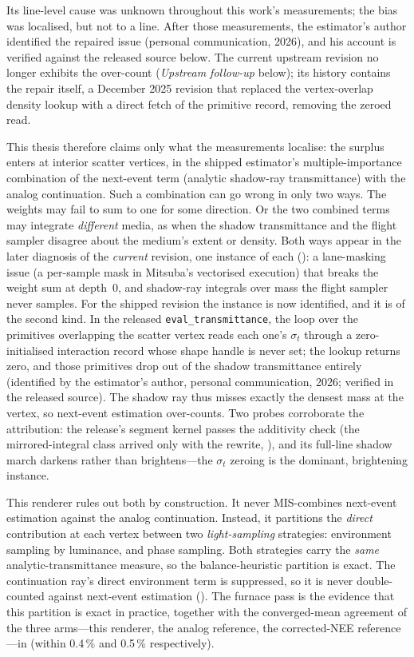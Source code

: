 Its line-level cause was unknown throughout this work's measurements; the bias was
localised, but not to a line. After those measurements, the estimator's author identified
the repaired issue (personal communication, 2026), and his account is verified against
the released source below. The current upstream revision no longer exhibits the over-count
(\emph{Upstream follow-up} below); its history contains the repair itself, a December 2025
revision that replaced the vertex-overlap density lookup with a direct fetch of the
primitive record, removing the zeroed read.

This thesis therefore claims
only what the measurements localise: the surplus enters at
interior scatter vertices, in the shipped estimator's multiple-importance combination of the
next-event term (analytic shadow-ray transmittance) with the analog continuation. Such a
combination can go wrong in only two ways. The weights may fail to sum to one for some
direction. Or the two
combined terms may integrate \emph{different} media, as when the shadow transmittance and the
flight sampler disagree about the medium's extent or density. Both ways appear in
the later diagnosis of the \emph{current} revision, one instance of each
(): a lane-masking issue (a per-sample mask in Mitsuba's vectorised execution) that breaks the weight sum at
depth~\num{0}, and shadow-ray integrals over mass the flight sampler never samples.
For the shipped revision the instance is now identified, and it is of the second kind. In
the released \texttt{eval\_transmittance}, the loop over the primitives overlapping the
scatter vertex reads each one's $\sigma_t$ through a zero-initialised interaction record
whose shape handle is never set; the lookup returns zero, and those primitives drop out of
the shadow transmittance entirely (identified by the estimator's author, personal
communication, 2026; verified in the released source). The shadow ray thus misses exactly
the densest mass at the vertex, so next-event estimation over-counts. Two probes
corroborate the attribution: the release's segment kernel passes the additivity check (the
mirrored-integral class arrived only with the rewrite, ), and its
full-line shadow march darkens rather than brightens---the $\sigma_t$ zeroing is the
dominant, brightening instance.

This renderer rules out both by construction.
It never MIS-combines next-event estimation against the analog continuation. Instead, it
partitions the \emph{direct} contribution at each vertex between two \emph{light-sampling}
strategies: environment sampling by luminance, and phase sampling. Both strategies carry the
\emph{same} analytic-transmittance measure, so the balance-heuristic partition is exact. The
continuation ray's direct environment term is suppressed, so it is never double-counted against
next-event estimation (). The furnace pass is the evidence that this
partition is exact in practice, together with the converged-mean agreement of the three
arms---this renderer, the analog reference, the corrected-NEE reference---in
 (within \num{0.4}\,\% and
\num{0.5}\,\% respectively).

